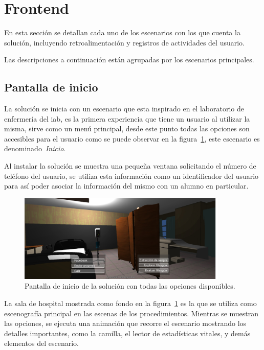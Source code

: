 \section{Frontend}

En esta sección se detallan cada uno de los escenarios con los que cuenta 
la solución, incluyendo retroalimentación y registros de actividades del 
usuario.

Las descripciones a continuación están agrupadas por los escenarios principales.

\subsection{Pantalla de inicio}

La solución se inicia con un escenario que esta inspirado en el laboratorio de
enfermería del \Gls{iab}, es la primera experiencia que tiene un usuario al
utilizar la misma, sirve como un menú principal, desde este punto todas las
opciones son accesibles para el usuario como se puede observar en la
figura~\ref{fig:pantalla_inicio}, este escenario es denominado~\emph{Inicio}.

Al instalar la solución se muestra una pequeña ventana solicitando el número de
teléfono del usuario, se utiliza esta información como un identificador del
usuario para así poder asociar la información del mismo con un alumno en
particular.

\begin{figure}[H] 
\centering 
\includegraphics[width=10cm]{solucion/images/pantalla_inicio.jpg}
\caption{Pantalla de inicio de la solución con todas las opciones disponibles.}
\label{fig:pantalla_inicio}
\end{figure}

La sala de hospital mostrada como fondo en la figura~\ref{fig:pantalla_inicio}
es la que se utiliza como escenografía principal en las escenas de los
procedimientos. Mientras se muestran las opciones, se ejecuta una animación que
recorre el escenario mostrando los detalles importantes, como la camilla, el
lector de estadísticas vitales, y demás elementos del escenario.

